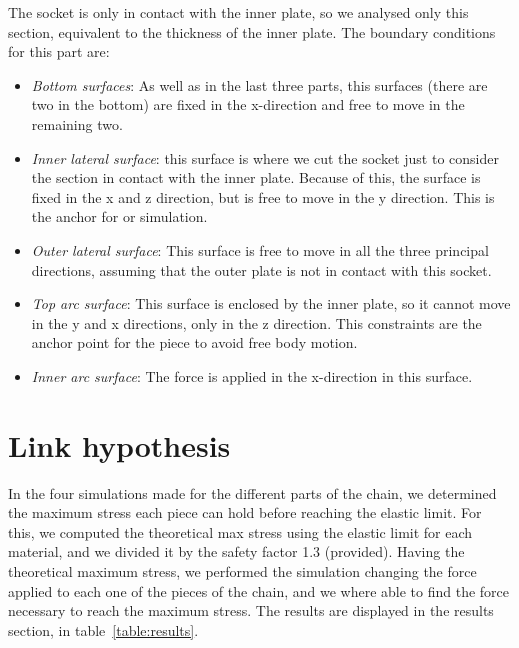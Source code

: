 \documentclass[a4paper 12pt]{article}
\begin{document}
The socket is only in contact with the inner plate, so we analysed only this section, equivalent to the thickness of the inner plate. The boundary conditions for this part are:

\begin{itemize}
    \item \textit{Bottom surfaces}: As well as in the last three parts, this surfaces (there are two in the bottom) are fixed in the x-direction and free to move in the remaining two. 
    \item \textit{Inner lateral surface}: this surface is where we cut the socket just to consider the section in contact with the inner plate. Because of this, the surface is fixed in the x and z direction, but is free to move in the y direction. This is the anchor for or simulation. 
    \item \textit{Outer lateral surface}: This surface is free to move in all the three principal directions, assuming that the outer plate is not in contact with this socket.
    \item \textit{Top arc surface}: This surface is enclosed by the inner plate, so it cannot move in the y and x directions, only in the z direction. This constraints are the anchor point for the piece to avoid free body motion.
    \item \textit{Inner arc surface}: The force is applied in the x-direction in this surface.
\end{itemize}


\section{Link hypothesis}

In the four simulations made for the different parts of the chain, we determined the maximum stress each piece can hold before reaching the elastic limit. For this, we computed the theoretical max stress using the elastic limit for each material, and we divided it by the safety factor 1.3 (provided). Having the theoretical maximum stress, we performed the simulation changing the force applied to each one of the pieces of the chain, and we where able to find the force necessary to reach the maximum stress. The results are displayed in the results section, in table~\ref{table:results}. 

\end{document}
